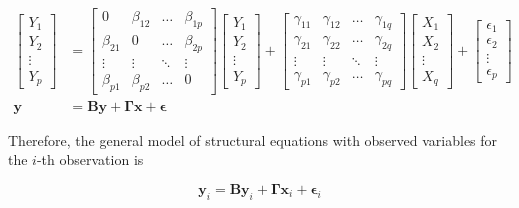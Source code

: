 \begin{align}
\begin{bmatrix}Y_{1}\\
Y_{2}\\
\vdots\\
Y_{p}
\end{bmatrix} & =\begin{bmatrix}0 & \beta_{12} & \ldots & \beta_{1p}\\
\beta_{21} & 0 & \ldots & \beta_{2p}\\
\vdots & \vdots & \ddots & \vdots\\
\beta_{p1} & \beta_{p2} & \ldots & 0
\end{bmatrix}\begin{bmatrix}Y_{1}\\
Y_{2}\\
\vdots\\
Y_{p}
\end{bmatrix}+\begin{bmatrix}\gamma_{11} & \gamma_{12} & \ldots & \gamma_{1q}\\
\gamma_{21} & \gamma_{22} & \ldots & \gamma_{2q}\\
\vdots & \vdots & \ddots & \vdots\\
\gamma_{p1} & \gamma_{p2} & \ldots & \gamma_{pq}
\end{bmatrix}\begin{bmatrix}X_{1}\\
X_{2}\\
\vdots\\
X_{q}
\end{bmatrix}+\begin{bmatrix}\epsilon_{1}\\
\epsilon_{2}\\
\vdots\\
\epsilon_{p}
\end{bmatrix}\label{eq:SEMO1}\\
\mathbf{y} & =\mathbf{B}\mathbf{y}+\bm{\Gamma}\mathbf{x}+\bm{\epsilon}\label{eq:SEMO2}
\end{align}

\normalsize

Therefore, the general model of structural equations with observed variables for the \(i\)-th observation is

\begin{equation}
\mathbf{y}_{i}  =\mathbf{B} \mathbf{y}_{i} + \bm{\Gamma}\bm{x}_{i} +  \bm{\epsilon}_{i}
\label{eq:SEMO3}
\end{equation}

